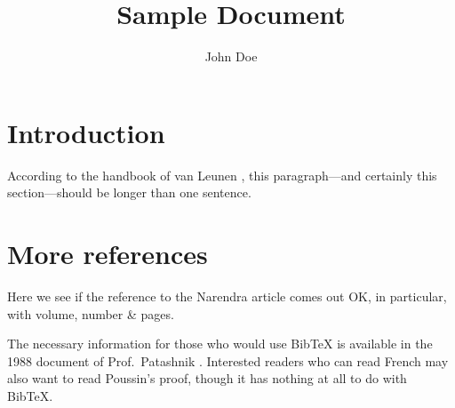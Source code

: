 \documentclass[11pt]{article}
\author{John Doe} \title{Sample Document}
\begin{document}
\maketitle

\section{Introduction}

According to the handbook of van Leunen \cite{vanleunen},
this paragraph---and certainly this
section---should be longer than one sentence.

\section{More references}

Here we see if the reference \cite{Narendra_1990}
to the Narendra article comes out OK, in particular,
with volume, number \& pages.

The necessary information for those who would use BibTeX
is available in the 1988 document of Prof.\ Patashnik \cite{btxdoc}.
Interested readers who can read French may also
want to read Poussin's proof\cite{primes}, though
it has nothing at all to do with BibTeX.



\end{document}
